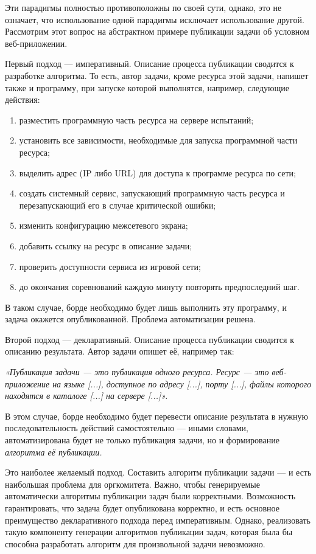 Эти парадигмы полностью противоположны по своей сути, однако, это не означает, что использование одной парадигмы исключает использование другой. Рассмотрим этот вопрос на абстрактном примере публикации задачи об условном веб-приложении.

Первый подход — императивный. Описание процесса публикации сводится к разработке алгоритма. То есть, автор задачи, кроме ресурса этой задачи, напишет также и программу, при запуске которой выполнятся, например, следующие действия:

\begin{enumerate}
\label{enum:netalgo}
\item разместить программную часть ресурса на сервере испытаний;
\item установить все зависимости, необходимые для запуска программной части ресурса;
\item выделить адрес (IP либо URL) для доступа к программе ресурса по сети;
\item создать системный сервис, запускающий программную часть ресурса и перезапускающий его в случае критической ошибки;
\item изменить конфигурацию межсетевого экрана;
\item добавить ссылку на ресурс в описание задачи;
\item проверить доступности сервиса из игровой сети;
\item до окончания соревнований каждую минуту повторять предпоследний шаг.
\end{enumerate}

В таком случае, борде необходимо будет лишь выполнить эту программу, и задача окажется опубликованной. Проблема автоматизации решена.

Второй подход — декларативный. Описание процесса публикации сводится к описанию результата. Автор задачи опишет её, например так:

\textit{«Публикация задачи — это публикация одного ресурса. Ресурс — это веб-приложение на языке [...], доступное по адресу [...], порту [...], файлы которого находятся в каталоге [...] на сервере [...]».}

В этом случае, борде необходимо будет перевести описание результата в нужную последовательность действий самостоятельно — иными словами, автоматизирована будет не только публикация задачи, но и формирование \textit{алгоритма её публикации.}

Это наиболее желаемый подход. Составить алгоритм публикации задачи — и есть наибольшая проблема для оргкомитета. Важно, чтобы генерируемые автоматически алгоритмы публикации задач были корректными. Возможность гарантировать, что задача будет опубликована корректно, и есть основное преимущество декларативного подхода перед императивным. Однако, реализовать такую компоненту генерации алгоритмов публикации задач, которая была бы способна разработать алгоритм для произвольной задачи невозможно.

